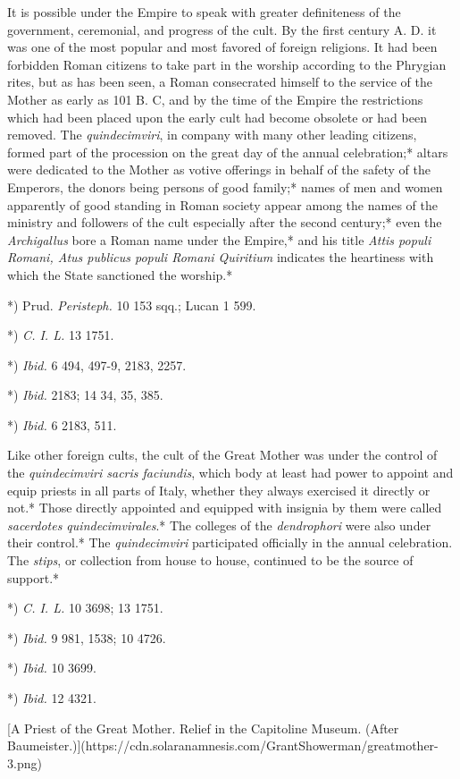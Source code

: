\documentclass[a4paper, 11pt, oneside, polutonikogreek, english]{article}
\begin{document}
It is possible under the Empire to speak with greater definiteness of the government, ceremonial, and progress of the cult. By the first century A. D. it was one of the most popular and most favored of foreign religions. It had been forbidden Roman citizens to take part in the worship according to the Phrygian rites, but as has been seen, a Roman consecrated himself to the service of the Mother as early as 101 B. C, and by the time of the Empire the restrictions which had been placed upon the early cult had become obsolete or had been removed. The \emph{quindecimviri}, in company with many other leading citizens, formed part of the procession on the great day of the annual celebration;* altars were dedicated to the Mother as votive offerings in behalf of the safety of the Emperors, the donors being persons of good family;* names of men and women apparently of good standing in Roman society appear among the names of the ministry and followers of the cult especially after the second century;* even the \emph{Archigallus} bore a Roman name under the Empire,* and his title \emph{Attis populi Romani, Atus publicus populi Romani Quiritium} indicates the heartiness with which the State sanctioned the worship.*

*) Prud. \emph{Peristeph.} 10 153 sqq.; Lucan 1 599.

*) \emph{C. I. L.} 13 1751.

*) \emph{Ibid.} 6 494, 497-9, 2183, 2257.

*) \emph{Ibid.} 2183; 14 34, 35, 385.

*) \emph{Ibid.} 6 2183, 511.

Like other foreign cults, the cult of the Great Mother was under the control of the \emph{quindecimviri sacris faciundis}, which body at least had power to appoint and equip priests in all parts of Italy, whether they always exercised it directly or not.* Those directly appointed and equipped with insignia by them were called \emph{sacerdotes quindecimvirales}.* The colleges of the \emph{dendrophori} were also under their control.* The \emph{quindecimviri} participated officially in the annual celebration. The \emph{stips}, or collection from house to house, continued to be the source of support.*

*) \emph{C. I. L.} 10 3698; 13 1751.

*) \emph{Ibid.} 9 981, 1538; 10 4726.

*) \emph{Ibid.} 10 3699.

*) \emph{Ibid.} 12 4321.

[A Priest of the Great Mother. Relief in the Capitoline Museum. (After Baumeister.)](https://cdn.solaranamnesis.com/GrantShowerman/greatmother-3.png)
\end{document}
